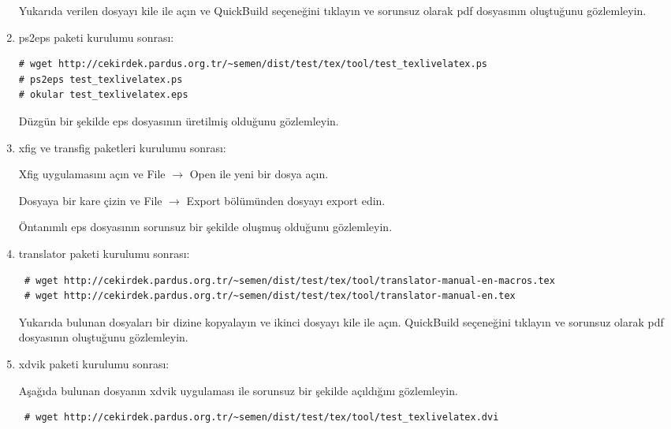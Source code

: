 \documentclass[a4paper,10pt]{article}
\begin{document}
\begin{enumerate}
Yukarıda verilen dosyayı kile ile açın ve QuickBuild  seçeneğini tıklayın ve sorunsuz olarak pdf dosyasının oluştuğunu gözlemleyin.

\item ps2eps paketi kurulumu sonrası:

\begin{verbatim}
# wget http://cekirdek.pardus.org.tr/~semen/dist/test/tex/tool/test_texlivelatex.ps
# ps2eps test_texlivelatex.ps
# okular test_texlivelatex.eps
\end{verbatim}

Düzgün bir şekilde eps dosyasının üretilmiş olduğunu gözlemleyin.
\item xfig ve transfig paketleri kurulumu sonrası:

Xfig uygulamasını açın ve File $\rightarrow$ Open ile yeni bir dosya açın.

Dosyaya bir kare çizin ve File $\rightarrow$ Export bölümünden dosyayı export edin.

Öntanımlı eps dosyasının sorunsuz bir şekilde oluşmuş olduğunu gözlemleyin.

\item translator paketi kurulumu sonrası:
\begin{verbatim}
 # wget http://cekirdek.pardus.org.tr/~semen/dist/test/tex/tool/translator-manual-en-macros.tex
 # wget http://cekirdek.pardus.org.tr/~semen/dist/test/tex/tool/translator-manual-en.tex
\end{verbatim}

Yukarıda bulunan dosyaları bir dizine kopyalayın ve ikinci dosyayı kile ile açın. QuickBuild  seçeneğini tıklayın ve sorunsuz olarak pdf dosyasının oluştuğunu gözlemleyin.
\item xdvik paketi kurulumu sonrası:

Aşağıda bulunan dosyanın xdvik uygulaması ile sorunsuz bir şekilde açıldığını gözlemleyin.
\begin{verbatim}
 # wget http://cekirdek.pardus.org.tr/~semen/dist/test/tex/tool/test_texlivelatex.dvi
 \end{verbatim}

\end{enumerate}
\end{document}
